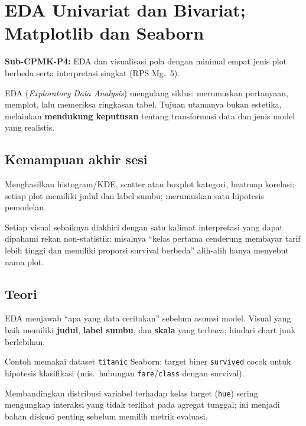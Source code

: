 \documentclass[../main.tex]{subfiles}
\begin{document}
\chapter{EDA Univariat dan Bivariat; Matplotlib dan Seaborn}

\begin{subcpmk}
  \item \textbf{Sub-CPMK-P4:} EDA dan visualisasi pola dengan minimal empat jenis plot berbeda serta interpretasi singkat (RPS Mg.\ 5).
\end{subcpmk}


\noindent EDA (\textit{Exploratory Data Analysis}) mengulang siklus: merumuskan pertanyaan, memplot, lalu memeriksa ringkasan tabel. Tujuan utamanya bukan estetika, melainkan \textbf{mendukung keputusan} tentang transformasi data dan jenis model yang realistis.

\section{Kemampuan akhir sesi}

Menghasilkan histogram/KDE, scatter atau boxplot kategori, heatmap korelasi; setiap plot memiliki judul dan label sumbu; merumuskan satu hipotesis pemodelan.

Setiap visual sebaiknya diakhiri dengan satu kalimat interpretasi yang dapat dipahami rekan non-statistik: misalnya ``kelas pertama cenderung membayar tarif lebih tinggi dan memiliki proporsi survival berbeda'' alih-alih hanya menyebut nama plot.

\section{Teori}

\begin{konsep}
EDA menjawab ``apa yang data ceritakan'' sebelum asumsi model. Visual yang baik memiliki \textbf{judul}, \textbf{label sumbu}, dan \textbf{skala} yang terbaca; hindari chart junk berlebihan.
\end{konsep}

\begin{catatan}
Contoh memakai dataset \texttt{titanic} Seaborn; target biner \texttt{survived} cocok untuk hipotesis klasifikasi (mis.\ hubungan \texttt{fare}/\texttt{class} dengan survival).
\end{catatan}

Membandingkan distribusi variabel terhadap kelas target (\texttt{hue}) sering mengungkap interaksi yang tidak terlihat pada agregat tunggal; ini menjadi bahan diskusi penting sebelum memilih metrik evaluasi.
\end{document}
